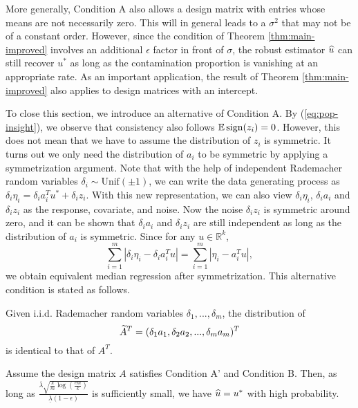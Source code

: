More generally, Condition A also allows a design matrix with entries whose means are not necessarily zero. This will in general leads to a $\sigma^2$ that may not be of a constant order. However, since the condition of Theorem \ref{thm:main-improved} involves an additional $\epsilon$ factor in front of $\sigma$, the robust estimator $\widehat{u}$ can still recover $u^*$ as long as the contamination proportion is vanishing at an appropriate rate. As an important application, the result of Theorem \ref{thm:main-improved} also applies to design matrices with an intercept.

To close this section, we introduce an alternative of Condition A. By (\ref{eq:pop-insight}), we observe that consistency also follows $\mathbb{E}\mathop{\rm sign}(z_i)=0$. However, this does not mean that we have to assume the distribution of $z_i$ is symmetric. It turns out we only need the distribution of $a_i$ to be symmetric by applying a symmetrization argument.
Note that with the help of independent Rademacher random variables $\delta_i\sim\text{Unif}(\pm 1)$, we can write the data generating process as $\delta_i\eta_i=\delta_ia_i^Tu^*+\delta_iz_i$. With this new representation, we can also view $\delta_i\eta_i$, $\delta_ia_i$ and $\delta_iz_i$ as the response, covariate, and noise. Now the noise $\delta_iz_i$ is symmetric around zero, and it can be shown that $\delta_ia_i$ and $\delta_iz_i$ are still independent as long as the distribution of $a_i$ is symmetric. Since for any $u\in\mathbb{R}^k$,
$$\sum_{i=1}^m|\delta_i\eta_i- \delta_ia_i^Tu|=\sum_{i=1}^m|\eta_i-a_i^Tu|,$$
we obtain equivalent median regression after symmetrization.
This alternative condition is stated as follows.


\begin{con1}
Given i.i.d. Rademacher random variables $\delta_1,...,\delta_m$, the distribution of
$$\widetilde{A}^T=(\delta_1a_1,\delta_2a_2,...,\delta_ma_m)^T$$
is identical to that of $A^T$.
\end{con1}
\begin{thm}\label{thm:robust-reg}
Assume the design matrix $A$ satisfies Condition A' and Condition B. Then, as long as $\frac{\overline{\lambda}\sqrt{\frac{k}{m}\log\left(\frac{em}{k}\right)}}{\underline{\lambda}(1-\epsilon)}$ is sufficiently small, we have $\widehat{u}=u^*$ with high probability.
\end{thm}
